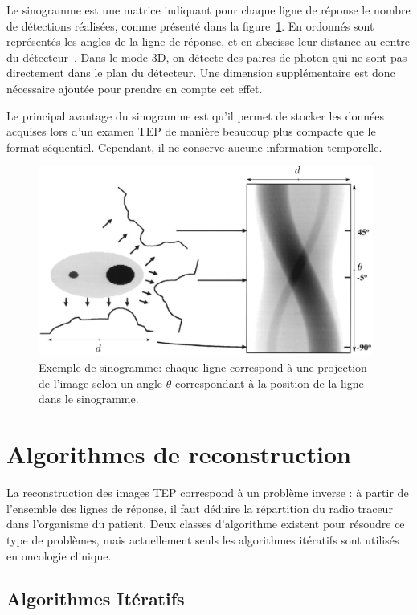 Le sinogramme est une matrice indiquant pour chaque ligne de réponse le nombre de détections réalisées, comme présenté dans la figure~\ref{fig:sino}. En ordonnés sont représentés les angles de la ligne de réponse, et en abscisse leur distance au centre du détecteur~\cite{fahey2002data}. Dans le mode 3D, on détecte des paires de photon qui ne sont pas directement dans le plan du détecteur. Une dimension supplémentaire est donc nécessaire ajoutée pour prendre en compte cet effet.

Le principal avantage du sinogramme est qu'il permet de stocker les données acquises lors d'un examen TEP de manière beaucoup plus compacte que le format séquentiel. Cependant, il ne conserve aucune information temporelle.

\begin{figure}
\centering
\includegraphics[width=11cm]{images/sino}
\caption[Principe du sinogramme]{Exemple de sinogramme: chaque ligne correspond à une projection de l'image selon un angle $\theta$ correspondant à la position de la ligne dans le sinogramme.}
\label{fig:sino}
\end{figure}


\chapter{Algorithmes de reconstruction}

La reconstruction des images TEP correspond à un problème inverse : à partir de l'ensemble des lignes de réponse, il faut déduire la répartition du radio traceur dans l'organisme du patient. Deux classes d'algorithme existent pour résoudre ce type de problèmes, mais actuellement seuls les algorithmes itératifs sont utilisés en oncologie clinique. 

	\section{Algorithmes Itératifs}

